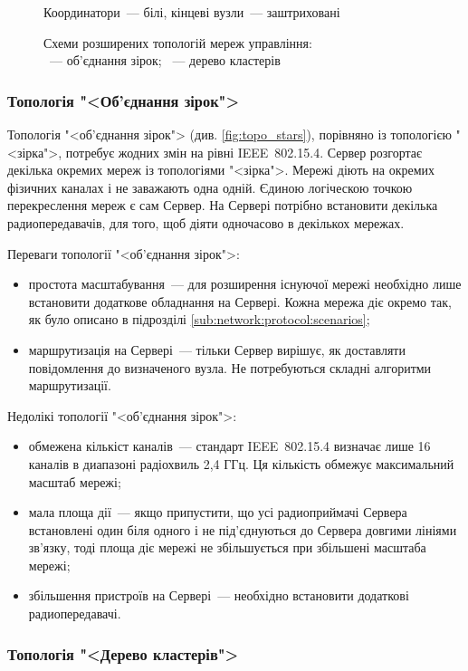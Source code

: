 \documentclass[a4paper,ukrainian,utf8,nocolumnsxix,floatsection,equationsection]{eskdtext}
\renewcommand\paragraph{\subsubsection}
\newcommand{\iee}[0]{IEEE~802.15.4\xspace}
\begin{document}
\begin{figure}[htb]
{{		}
	}
	\caption*{Координатори~--- білі, кінцеві вузли~--- заштриховані}
	\caption{\label{fig:expansion:topologies}Схеми розширених топологій мереж управління:\\
		\protect{}~--- об’єднання зірок; \protect{}~--- дерево кластерів
	}
\end{figure}

\paragraph{Топологія "<Об’єднання зірок">}

Топологія "<об’єднання зірок"> (див. \cref{fig:topo_stars}), порівняно із топологією "<зірка">, потребує жодних змін на рівні \iee. Сервер розгортає декілька окремих мереж із топологіями "<зірка">. Мережі діють на окремих фізичних каналах і не заважають одна одній. Єдиною логіческою точкою перекреслення мереж є сам Сервер. На Сервері потрібно встановити декілька радиопередавачів, для того, щоб діяти одночасово в декількох мережах.

Переваги топології "<об’єднання зірок">:
\begin{itemize}
	\item простота масштабування~--- для розширення існуючої мережі необхідно лише встановити додаткове обладнання на Сервері. Кожна мережа діє окремо так, як було описано в підрозділі \ref{sub:network:protocol:scenarios};
	\item маршрутизація на Сервері~--- тільки Сервер вирішує, як доставляти повідомлення до визначеного вузла. Не потребуються складні алгоритми маршрутизації.
\end{itemize}

Недолікі топології "<об’єднання зірок">:
\begin{itemize}
	\item обмежена кількіст каналів~--- стандарт \iee визначає лише 16 каналів в диапазоні радіохвиль 2,4 ГГц. Ця кількість обмежує максимальний масштаб мережі;
	\item мала площа дії~--- якщо припустити, що усі радиоприймачі Сервера встановлені один біля одного і не під’єднуються до Сервера довгими лініями зв’язку, тоді площа діє мережі не збільшується при збільшені масштаба мережі;
	\item збільшення пристроїв на Сервері~--- необхідно встановити додаткові радиопередавачі.
\end{itemize}

\paragraph{Топологія "<Дерево кластерів">}
\end{document}
